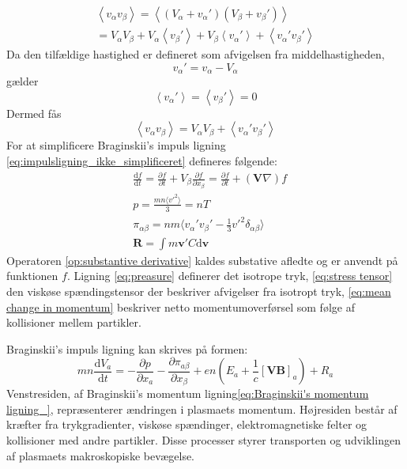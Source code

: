 \begin{gather*}
    \left\langle v_\alpha v_\beta \right\rangle = \left\langle(V_\alpha + v_\alpha')(V_\beta + v_\beta')\right\rangle \\
    = V_\alpha V_\beta + V_\alpha \left\langle v_\beta' \right\rangle + V_\beta \left\langle v_\alpha' \right\rangle + \left\langle v_\alpha'v_\beta' \right\rangle
\end{gather*}
Da den tilfældige hastighed er defineret som afvigelsen fra middelhastigheden,
\begin{equation*}
    v_\alpha' = v_\alpha - V_\alpha
\end{equation*}
gælder
\begin{equation*} \left\langle v_\alpha' \right\rangle = \left\langle v_\beta' \right\rangle = 0
\end{equation*}
Dermed fås
\begin{equation*} 
    \left\langle v_\alpha v_\beta \right\rangle = V_\alpha V_\beta + \left\langle v_\alpha'v_\beta' \right\rangle
\end{equation*}
For at simplificere Braginskii's impuls ligning \eqref{eq:impulsligning_ikke_simplificeret} defineres følgende:
\begin{align}
    &\frac{\mathrm{d}f}{\mathrm{d}t}
    = \frac{\partial f}{\partial t} + V_\beta \frac{\partial f}{\partial x_\beta}
    = \frac{\partial f}{\partial t} + (\mathbf{V}\nabla)f \label{op:substantive derivative} \\
    &p = \frac{mn \langle v'^2\rangle}{3} = nT \label{eq:preasure}\\
    &\pi_{\alpha\beta} = nm\langle v_\alpha ' v_\beta ' - \frac{1}{3}v'^2\delta_{\alpha\beta} \rangle \label{eq:stress tensor}\\
    &\mathbf{R} = \int m\mathbf{v}'C \mathrm{d}\mathbf{v} \label{eq:mean change in momentum}
\end{align}
Operatoren \eqref{op:substantive derivative} kaldes substative afledte og er anvendt på funktionen $f$.
Ligning \eqref{eq:preasure} definerer det isotrope tryk,
\eqref{eq:stress tensor} den viskøse spændingstensor der  beskriver afvigelser fra isotropt tryk,
\eqref{eq:mean change in momentum} beskriver netto momentumoverførsel som følge af kollisioner mellem partikler.

Braginskii's impuls ligning kan skrives på formen:
\begin{equation}
    mn\frac{\mathrm{d}V_a}{\mathrm{d}t} = - \frac{\partial p}{\partial x_a} - \frac{\partial \pi_{a\beta}}{\partial x_\beta}
    + en\left(E_a + \frac{1}{c} \left[\mathbf{VB}\right]_a\right) + R_a \label{eq:Braginskii's momentum ligning_}
\end{equation}
Venstresiden, af Braginskii's momentum ligning\eqref{eq:Braginskii's momentum ligning_}, repræsenterer ændringen i plasmaets momentum.
Højresiden består af kræfter fra trykgradienter, viskøse spændinger, elektromagnetiske felter og kollisioner med andre partikler.
Disse processer styrer transporten og udviklingen af plasmaets makroskopiske bevægelse.

